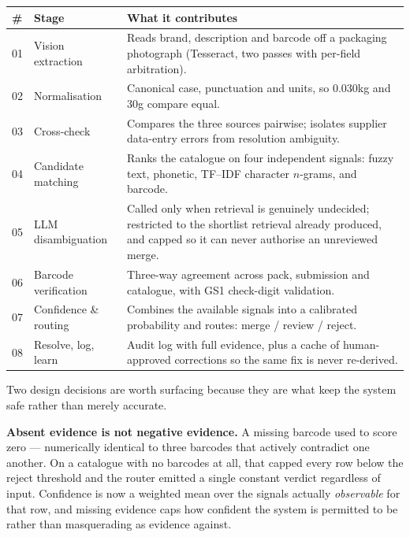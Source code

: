 \begin{center}
\begin{tabular}{@{}p{0.6cm}p{4.4cm}p{10.6cm}@{}}
\toprule
\textbf{\#} & \textbf{Stage} & \textbf{What it contributes} \\
\midrule
01 & Vision extraction   & Reads brand, description and barcode off a packaging photograph (Tesseract, two passes with per-field arbitration). \\
02 & Normalisation       & Canonical case, punctuation and units, so \textsf{0.030kg} and \textsf{30g} compare equal. \\
03 & Cross-check         & Compares the three sources pairwise; isolates supplier data-entry errors from resolution ambiguity. \\
04 & Candidate matching  & Ranks the catalogue on four independent signals: fuzzy text, phonetic, TF--IDF character $n$-grams, and barcode. \\
05 & LLM disambiguation  & Called only when retrieval is genuinely undecided; restricted to the shortlist retrieval already produced, and capped so it can never authorise an unreviewed merge. \\
06 & Barcode verification & Three-way agreement across pack, submission and catalogue, with GS1 check-digit validation. \\
07 & Confidence \& routing & Combines the available signals into a calibrated probability and routes: merge / review / reject. \\
08 & Resolve, log, learn & Audit log with full evidence, plus a cache of human-approved corrections so the same fix is never re-derived. \\
\bottomrule
\end{tabular}
\end{center}

Two design decisions are worth surfacing because they are what keep the system
safe rather than merely accurate.

\textbf{Absent evidence is not negative evidence.} A missing barcode used to score
zero --- numerically identical to three barcodes that actively contradict one
another. On a catalogue with no barcodes at all, that capped every row below the
reject threshold and the router emitted a single constant verdict regardless of
input. Confidence is now a weighted mean over the signals actually
\emph{observable} for that row, and missing evidence caps how confident the
system is permitted to be rather than masquerading as evidence against.


